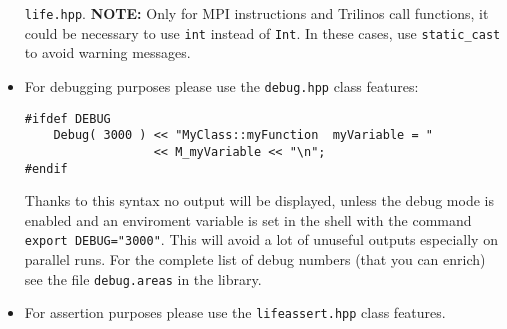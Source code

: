 \documentclass[a4paper]{article}
\begin{document}
\begin{itemize}
  \texttt{life.hpp}. \newline \textbf{NOTE:} Only for MPI instructions and
  Trilinos call functions, it could be necessary to use \texttt{int} instead of \texttt{Int}.
  In these cases, use \texttt{static\_cast} to avoid warning messages.
  \item For debugging purposes please use the \texttt{debug.hpp} class features:
\begin{lstlisting}
#ifdef DEBUG
    Debug( 3000 ) << "MyClass::myFunction  myVariable = "
                  << M_myVariable << "\n";
#endif
\end{lstlisting}
  Thanks to this syntax no output will be displayed, unless the debug
  mode is enabled and an enviroment variable is set in the shell with the
  command \texttt{export DEBUG="3000"}. This will avoid a lot of unuseful
  outputs especially on parallel runs. For the complete list of debug numbers
  (that you can enrich) see the file \texttt{debug.areas} in the library.
  \item For assertion purposes please use the \texttt{lifeassert.hpp} class
  features.
\end{itemize}
\end{document}
